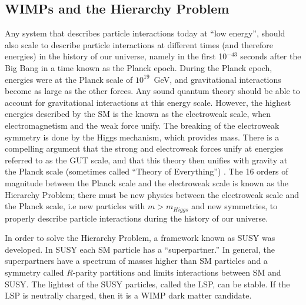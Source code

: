 \subsection{WIMPs and the Hierarchy Problem}
\label{sec:wimp_miracle}
Any system that describes particle interactions today at ``low energy'', should also scale to describe particle interactions at different times (and therefore energies) in the history of our universe, namely in the first 10$^{-43}$ seconds after the Big Bang in a time known as the Planck epoch. During the Planck epoch, energies were at the Planck scale of $10^{19}$~GeV, and gravitational interactions become as large as the other forces. Any sound quantum theory should be able to account for gravitational interactions at this energy scale. However, the highest energies described by the \ac{SM} is the known as the electroweak scale, when electromagnetism and the weak force unify. The breaking of the electroweak symmetry is done by the Higgs mechanism, which provides mass. There is a compelling argument that the strong and electroweak forces unify at energies referred to as the \ac{GUT} scale, and that this theory then unifies with gravity at the Planck scale (sometimes called ``Theory of Everything'') \cite{Dimopoulos1991}. The 16 orders of magnitude between the Planck scale and the electroweak scale is known as the Hierarchy Problem; there must be new physics between the electroweak scale and the Planck scale, i.e new particles with $m > m_{Higgs}$ and new symmetries, to properly describe particle interactions during the history of our universe.

In order to solve the Hierarchy Problem, a framework known as \ac{SUSY} was developed. In \ac{SUSY} each \ac{SM} particle has a ``superpartner.'' In general, the superpartners have a spectrum of masses higher than \ac{SM} particles and a symmetry called $R$-parity partitions and limits interactions between \ac{SM} and \ac{SUSY}. The lightest of the \ac{SUSY} particles, called the \ac{LSP}, can be stable. If the \ac{LSP} is neutrally charged, then it is a \ac{WIMP} dark matter candidate.

